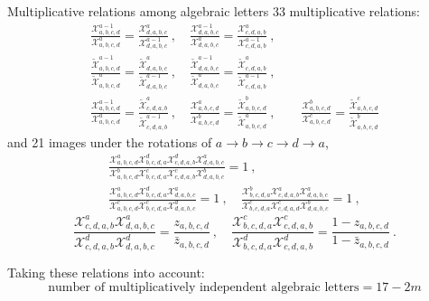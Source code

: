 \documentclass[10pt]{beamer}
\begin{document}
\begin{frame}{Multiplicative relations among algebraic letters}
\footnotesize{
33 multiplicative relations:
  \begin{gather*}
    \frac{\mathcal{X}_{a,b,c,d}^{a-1}}{\mathcal{X}_{a,b,c,d}^{a}} =\frac{\mathcal{X}_{d,a,b,c}^{a}}{\mathcal{X}_{d,a,b,c}^{a-1}}\:,\quad \frac{\mathcal{X}_{d,a,b,c}^{a-1}}{\mathcal{X}_{d,a,b,c}^{a}} =\frac{\mathcal{X}_{c,d,a,b}^{a}}{\mathcal{X}_{c,d,a,b}^{a-1}}\:, \nonumber \\
    \frac{\widetilde{\mathcal{X}}_{a,b,c,d}^{a-1}}{\widetilde{\mathcal{X}}_{a,b,c,d}^{a}} =\frac{\widetilde{\mathcal{X}}_{d,a,b,c}^{a}}{\widetilde{\mathcal{X}}_{d,a,b,c}^{a-1}}\:,\quad \frac{\widetilde{\mathcal{X}}_{d,a,b,c}^{a-1}}{\widetilde{\mathcal{X}}_{d,a,b,c}^{a}} =\frac{\widetilde{\mathcal{X}}_{c,d,a,b}^{a}}{\widetilde{\mathcal{X}}_{c,d,a,b}^{a-1}}  \:,\\
    \frac{\mathcal{X}_{a,b,c,d}^{a-1}}{\mathcal{X}_{a,b,c,d}^{a}}=\frac{\widetilde{\mathcal{X}}_{c,d,a,b}^{a}}{\widetilde{\mathcal{X}}_{c,d,a,b}^{a-1}} \:,\quad \frac{\mathcal{X}_{a,b,c,d}^{a}}{\mathcal{X}_{a,b,c,d}^{b}}=\frac{\widetilde{\mathcal{X}}_{a,b,c,d}^{b}}{\widetilde{\mathcal{X}}_{a,b,c,d}^{a}}\:,\qquad 
    \frac{\mathcal{X}_{a,b,c,d}^{b}}{\mathcal{X}_{a,b,c,d}^{c}}=\frac{\widetilde{\mathcal{X}}_{a,b,c,d}^{c}}{\widetilde{\mathcal{X}}_{a,b,c,d}^{b}} \nonumber
    \end{gather*}
    and 21 images under the rotations of $a\to b\to c\to d\to a$, 
    \begin{gather*}
      \frac{\mathcal{X}_{a,b,c,d}^{a}\mathcal{X}_{b,c,d,a}^{d}\mathcal{X}_{c,d,a,b}^{d}\mathcal{X}_{d,a,b,c}^{a}}{\mathcal{X}_{a,b,c,d}^{b}\mathcal{X}_{b,c,d,a}^{c}\mathcal{X}_{c,d,a,b}^{c}\mathcal{X}_{d,a,b,c}^{b}} =1 \:, \\
      \frac{\mathcal{X}_{a,b,c,d}^{a}\mathcal{X}_{b,c,d,a}^{d}\mathcal{X}_{d,a,b,c}^{a}}{\mathcal{X}_{a,b,c,d}^{c}\mathcal{X}_{b,c,d,a}^{c}\mathcal{X}_{d,a,b,c}^{d}} =1 \:,\quad 
      \frac{\mathcal{X}_{b,c,d,a}^{b}\mathcal{X}_{c,d,a,b}^{a}\mathcal{X}_{d,a,b,c}^{a}}{\mathcal{X}_{b,c,d,a}^{c}\mathcal{X}_{c,d,a,d}^{c}\mathcal{X}_{d,a,b,c}^{b}} =1 \:, \nonumber
  \end{gather*}
  \begin{equation*} %
      \frac{\mathcal{X}_{c,d,a,b}^{a}\mathcal{X}_{d,a,b,c}^{a}}{\mathcal{X}_{c,d,a,b}^{d}\mathcal{X}_{d,a,b,c}^{d}} =\frac{z_{a,b,c,d}}{\bar{z}_{a,b,c,d}} \:,\quad 
      \frac{\mathcal{X}_{b,c,d,a}^{c}\mathcal{X}_{c,d,a,b}^{c}}{\mathcal{X}_{b,c,d,a}^{d}\mathcal{X}_{c,d,a,b}^{d}} = \frac{1-z_{a,b,c,d}}{1-\bar{z}_{a,b,c,d}} \:.
  \end{equation*}
}   

Taking these relations into account:
\[
\text{number of multiplicatively independent algebraic letters} = 17-2m
\]
\end{frame}
\end{document}
